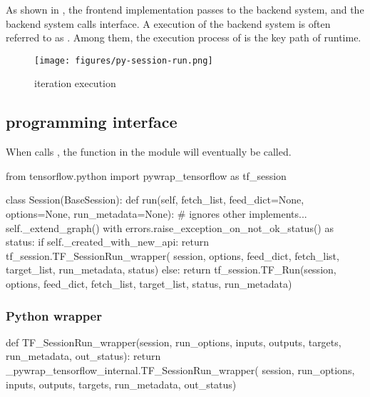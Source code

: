 \begin{content}

As shown in , the  frontend implementation passes  to the backend system, and the backend system calls  interface. A  execution of the backend system is often referred to as . Among them, the execution process of  is the key path of  runtime.

\begin{figure}[H]
\centering
\texttt{[image: figures/py-session-run.png]}
\caption{iteration execution}
 \label{fig:py-session-run}
\end{figure}

\subsection{programming interface}

When  calls , the function in the  module will eventually be called.

\begin{leftbar}
\begin{python}[caption={tensorflow/python/client/session.py}]
from tensorflow.python import pywrap_tensorflow as tf_session

class Session(BaseSession):
  def run(self, fetch_list, feed_dict=None, options=None, run_metadata=None):
    # ignores other implements...
    self._extend_graph()
    with errors.raise_exception_on_not_ok_status() as status:
      if self._created_with_new_api:
        return tf_session.TF_SessionRun_wrapper(
            session, options, feed_dict, fetch_list, target_list,
            run_metadata, status)
      else:
        return tf_session.TF_Run(session, options,
                                 feed_dict, fetch_list, target_list,
                                 status, run_metadata)
\end{python}
\end{leftbar}


\subsubsection{Python wrapper}

\begin{leftbar}
\begin{python}[caption={tensorflow/bazel-bin/tensorflow/python/pywrap\_tensorflow\_internal.py}]
def TF_SessionRun_wrapper(session, run_options, inputs, 
  outputs, targets, run_metadata, out_status):
  return _pywrap_tensorflow_internal.TF_SessionRun_wrapper(
    session, run_options, inputs, outputs, targets, run_metadata, out_status)


\end{python}
\end{leftbar}
\end{content}
